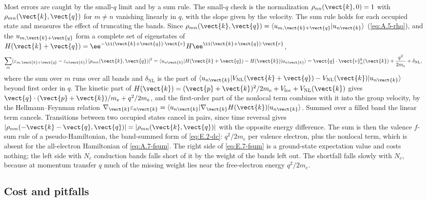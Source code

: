 Most errors are caught by the small-$q$ limit and by a sum rule. The small-$q$ check is the normalization $\rho_{nn}(\vect{k},0) = 1$ with $\rho_{mn}(\vect{k},\vect{q})$ for $m \neq n$ vanishing linearly in $q$, with the slope given by the velocity. The sum rule holds for each occupied state and measures the effect of truncating the bands. Since $\rho_{mn}(\vect{k},\vect{q}) = \langle u_{m,\vect{k}+\vect{q}}|u_{n\vect{k}}\rangle$ (\cref{eq:A.5-rho}), and the $u_{m,\vect{k}+\vect{q}}$ form a complete set of eigenstates of $H(\vect{k}+\vect{q}) = \ee^{-\ii(\vect{k}+\vect{q})\cdot\vect{r}}H\ee^{\ii(\vect{k}+\vect{q})\cdot\vect{r}}$,
\begin{equation}
  \sum_m(\varepsilon_{m,\vect{k}+\vect{q}} - \varepsilon_{n\vect{k}})\,|\rho_{mn}(\vect{k},\vect{q})|^2 = \langle u_{n\vect{k}}|H(\vect{k}+\vect{q}) - H(\vect{k})|u_{n\vect{k}}\rangle
  = \vect{q}\cdot\vect{v}^{\mathrm{g}}_n(\vect{k}) + \frac{q^2}{2m_e} + \delta_{\mathrm{NL}} ,
  \label{eq:E.7-fsum}
\end{equation}
where the sum over $m$ runs over all bands and $\delta_{\mathrm{NL}}$ is the part of $\langle u_{n\vect{k}}|V_{\mathrm{NL}}(\vect{k}+\vect{q}) - V_{\mathrm{NL}}(\vect{k})|u_{n\vect{k}}\rangle$ beyond first order in $q$. The kinetic part of $H(\vect{k}) = (\vect{p}+\vect{k})^2/2m_e + V_{\mathrm{loc}} + V_{\mathrm{NL}}(\vect{k})$ gives $\vect{q}\cdot(\vect{p}+\vect{k})/m_e + q^2/2m_e$, and the first-order part of the nonlocal term combines with it into the group velocity, by the Hellmann--Feynman relation $\nabla_{\vect{k}}\varepsilon_{n\vect{k}} = \langle u_{n\vect{k}}|\nabla_{\vect{k}}H(\vect{k})|u_{n\vect{k}}\rangle$. Summed over a filled band the linear term cancels. Transitions between two occupied states cancel in pairs, since time reversal gives $|\rho_{nm}(-\vect{k}-\vect{q},\vect{q})| = |\rho_{mn}(\vect{k},\vect{q})|$ with the opposite energy difference. The sum is then the valence $f$-sum rule of a pseudo-Hamiltonian, the band-summed form of \cref{eq:E.2-dc}: $q^2/2m_e$ per valence electron, plus the nonlocal term, which is absent for the all-electron Hamiltonian of \cref{eq:A.7-fsum}. The right side of \cref{eq:E.7-fsum} is a ground-state expectation value and costs nothing; the left side with $N_c$ conduction bands falls short of it by the weight of the bands left out. The shortfall falls slowly with $N_c$, because at momentum transfer $q$ much of the missing weight lies near the free-electron energy $q^2/2m_e$.

\subsection{Cost and pitfalls}

